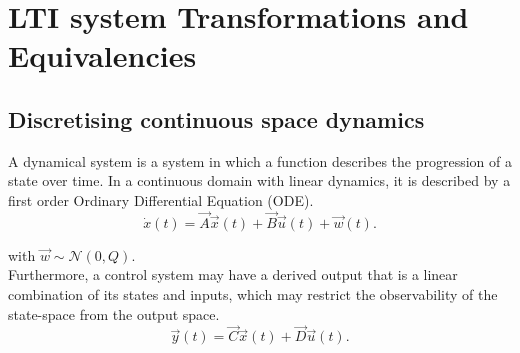 \documentclass[runningheads,a4paper]{llncs}
\begin{document}
\newpage
\appendix
\section{LTI system Transformations and Equivalencies} \label{sec:appendix}

\subsection{Discretising continuous space dynamics}

A dynamical system is a system in which a function describes the progression of a state over time. 
In a continuous domain with linear dynamics, it is described by a first order Ordinary Differential Equation (ODE).
\begin{equation}
\dot{x}(t)=\vec{A}\vec{x}(t)+\vec{B}\vec{u}(t) +\vec{w}(t).
\label{eq:dynamical}
\end{equation}

\noindent with $\vec{w} \sim \mathcal{N}(0,Q)$.\\
Furthermore, a control system may have a derived output that is a linear combination of its states and inputs, 
which may restrict the observability of the state-space from the output space.
\begin{equation}
\vec{y}(t)=\vec{C}\vec{x}(t)+\vec{D}\vec{u}(t).
\end{equation}
\end{document}

